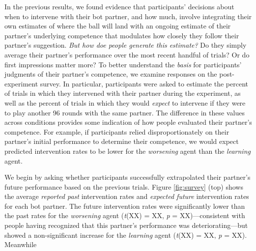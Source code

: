 \documentclass[10pt,letterpaper]{article}
\begin{document}
In the previous results, we found evidence that participants' decisions about when to intervene with their bot partner, and how much, involve integrating their own estimates of where the ball will land with an ongoing estimate of their partner's underlying competence that modulates how closely they follow their partner's suggestion. \textit{But how doe people generate this estimate?} Do they simply average their partner's performance over the most recent handful of trials? Or do first impressions matter more? To better understand the \textit{basis} for participants' judgments of their partner's competence, we examine responses on the post-experiment survey. In particular, participants were asked to estimate the percent of trials in which they intervened with their partner during the experiment, as well as the percent of trials in which they would \textit{expect} to intervene if they were to play another 96 rounds with the same partner. The difference in these values across conditions provides some indication of how people evaluated their partner's competence. For example, if participants relied disproportionately on their partner's initial performance to determine their competence, we would expect predicted intervention rates to be lower for the \textit{worsening} agent than the \textit{learning} agent. 

We begin by asking whether participants successfully extrapolated their partner's future performance based on the previous trials. Figure \ref{fig:survey} (top) shows the average \textit{reported past} intervention rates and \textit{expected future} intervention rates for each bot partner. The future intervention rates were significantly lower than the past rates for the \textit{worsening} agent (\textit{t}(XX) = XX, \textit{p} = XX)---consistent with people having recognized that this partner's performance was deteriorating---but showed a non-significant increase for the \textit{learning} agent (\textit{t}(XX) = XX, \textit{p} = XX). Meanwhile
\end{document}
